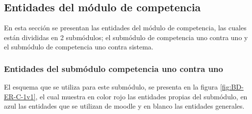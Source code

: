 \clearpage
\subsection{Entidades del módulo de competencia}

 En esta sección se presentan las entidades del módulo de competencia,
 las cuales están divididas en 2 submódulos;
 el submódulo de competencia uno contra uno y el submódulo de competencia uno contra sistema.\\
 
    \subsubsection{Entidades del submódulo competencia uno contra uno}
 
        El esquema que se utiliza para este submódulo, se presenta en la figura 
        \ref{fig:BD-ER-C-1v1}, el cual muestra en color rojo las entidades propias del submódulo, 
        en azul las entidades que se utilizan de moodle  y en blanco las entidades generales. 



